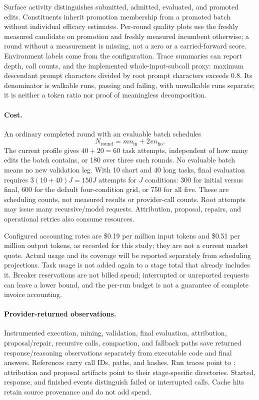 Surface activity distinguishes submitted, admitted, evaluated, and promoted
edits. Constituents inherit promotion membership from a promoted batch without
individual efficacy estimates. Per-round quality plots use the freshly measured
candidate on promotion and freshly measured incumbent otherwise; a round without
a measurement is missing, not a zero or a carried-forward score. Environment
labels come from the configuration. Trace summaries can report depth, call
counts, and the implemented whole-input-subcall proxy: maximum descendant prompt
characters divided by root prompt characters exceeds 0.8. Its denominator is
walkable runs, passing and failing, with unwalkable runs separate; it is neither
a token ratio nor proof of meaningless decomposition.

\paragraph{Cost.}
An ordinary completed round with an evaluable batch schedules
\begin{equation}
N_{\mathrm{round}}=m n_{\mathrm{in}}+2v n_{\mathrm{ho}}.
\label{eq:round-cost}
\end{equation}
The current profile gives $40+20=60$ task attempts, independent of how many
edits the batch contains, or 180 over three such rounds. No evaluable batch
means no new validation leg. With 10 short and 40 long tasks, final evaluation
requires $3(10+40)J=150J$ attempts for $J$ conditions: 300 for initial versus
final, 600 for the default four-condition grid, or 750 for all five. These are
scheduling counts, not measured results or provider-call counts. Root attempts
may issue many recursive/model requests. Attribution, proposal, repairs, and
operational retries also consume resources.

Configured accounting rates are \$0.19 per million input tokens and \$0.51 per
million output tokens, as recorded for this study; they are not a current market
quote. Actual usage and its coverage will be reported separately from scheduling
projections. Task usage is not added again to a stage total
that already includes it. Breaker reservations are not billed spend; interrupted
or unreported requests can leave a lower bound, and the per-run budget is not a
guarantee of complete invoice accounting.

\paragraph{Provider-returned observations.}
Instrumented execution, mining, validation, final evaluation, attribution,
proposal/repair, recursive calls, compaction, and fallback paths save returned
response/reasoning observations separately from executable code and final
answers. References carry call IDs, paths, and hashes. Run traces point to
; attribution and proposal artifacts point to
their stage-specific  directories. Started, response, and finished
events distinguish failed or interrupted calls. Cache hits retain source
provenance and do not add spend.

